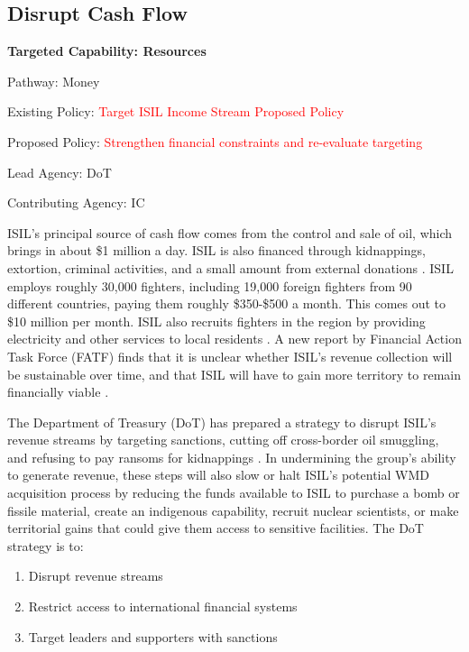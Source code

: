 \documentclass{report}
\begin{document}
\subsection{Disrupt Cash Flow}

\bfseries Targeted Capability: Resources 

Pathway: Money 

Existing Policy: \textcolor{red}{Target ISIL Income Stream Proposed Policy}

Proposed Policy: \textcolor{red}{Strengthen financial constraints and re-evaluate targeting}  

Lead Agency: DoT

Contributing Agency: IC \normalfont


ISIL's principal source of cash flow comes from the control and sale of oil, which brings in about \$1 million a day. ISIL is also financed through kidnappings, extortion, criminal activities, and a small amount from external donations \cite{Lister2014}. ISIL employs roughly 30,000 fighters, including 19,000 foreign fighters from 90 different countries, paying them roughly \$350-\$500 a month. This comes out to \$10 million per month. ISIL also recruits fighters in the region by providing electricity and other services to local residents \cite{TheEditorialBoard2015}. A new report by Financial Action Task Force (FATF) finds that it is unclear whether ISIL's revenue collection will be sustainable over time, and that ISIL will have to gain more territory to remain financially viable \cite{TheEditorialBoard2015,Report2015}.

The Department of Treasury (DoT) has prepared a strategy to disrupt ISIL's revenue streams by targeting sanctions, cutting off cross-border oil smuggling, and refusing to pay ransoms for kidnappings \cite{Cohen2014}. In undermining the group's ability to generate revenue, these steps will also slow or halt ISIL's potential WMD acquisition process by reducing the funds available to ISIL to purchase a bomb or fissile material, create an indigenous capability, recruit nuclear scientists, or make territorial gains that could give them access to sensitive facilities. The DoT strategy is to:

\begin{enumerate}
 \item Disrupt revenue streams
 \item Restrict access to international financial systems
 \item Target leaders and supporters with sanctions
\end{enumerate}
\end{document}

